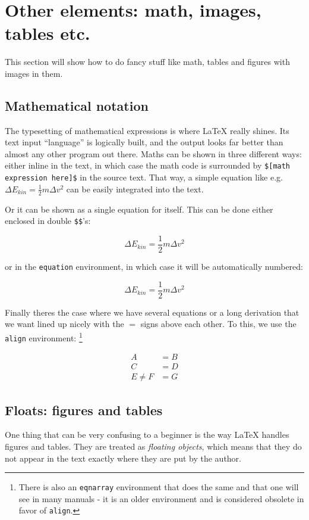 \documentclass[a4paper, 11pt]{article} %
\begin{document}
\section{Other elements: math, images, tables etc.}

This section will show how to do fancy stuff like math, tables and figures with
images in them.


\subsection{Mathematical notation}

The typesetting of mathematical expressions is where \LaTeX{} really shines. Its
text input ``language'' is logically built, and the output looks far better
than almost any other program out there. Maths can be shown in three different
ways: either inline in the text, in which case the math code is surrounded by
\texttt{\$[math expression here]\$} in the source text. That way, a simple
equation like e.g. $\Delta E_{kin}=\frac{1}{2}m \Delta v^2$ can be easily
integrated into the text. 

Or it can be shown as a single equation for itself. This can be done either
enclosed in double \texttt{\$\$}'s:

$$\Delta E_{kin}=\frac{1}{2}m\Delta v^2$$

or in the \texttt{equation} environment, in which case it will be automatically
numbered: 

\begin{equation}
	\Delta E_{kin}=\frac{1}{2}m\Delta v^2
	\label{eqn:ekin}
\end{equation}

Finally theres the case where we have several equations or a long derivation
that we want lined up nicely with the $=$ signs above each other. To this, we
use the \texttt{align} environment: \footnote{There is also an
\texttt{eqnarray} environment that does the same and that one will
see in many manuals - it is an older environment and is considered obsolete
in favor of \texttt{align}.}

\begin{align}
       A &= B \\
       C &= D \\
       E \neq F &= G
	\label{eqn:aligndemo}
\end{align}


\subsection{Floats: figures and tables}
One thing that can be very confusing to a beginner is the way \LaTeX{} handles
figures and tables. They are treated as \emph{floating objects}, which means
that they do not appear in the text exactly where they are put by the author. 
\end{document}
